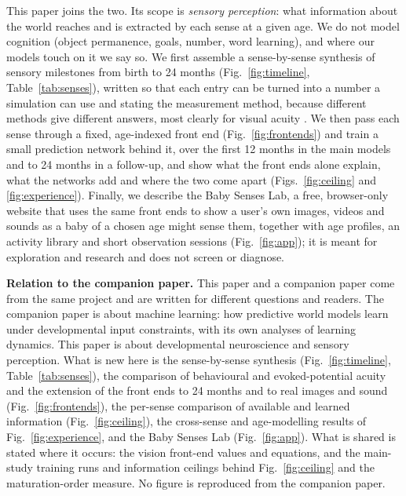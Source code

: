 \documentclass{article}
\begin{document}
This paper joins the two. Its scope is \emph{sensory perception}: what information about the world reaches and is extracted by each sense at a given age. We do not model cognition (object permanence, goals, number, word learning), and where our models touch on it we say so. We first assemble a sense-by-sense synthesis of sensory milestones from birth to 24 months (Fig.~\ref{fig:timeline}, Table~\ref{tab:senses}), written so that each entry can be turned into a number a simulation can use and stating the measurement method, because different methods give different answers, most clearly for visual acuity \autocite{dobson1978visual}. We then pass each sense through a fixed, age-indexed front end (Fig.~\ref{fig:frontends}) and train a small prediction network behind it, over the first 12 months in the main models and to 24 months in a follow-up, and show what the front ends alone explain, what the networks add and where the two come apart (Figs.~\ref{fig:ceiling} and \ref{fig:experience}). Finally, we describe the Baby Senses Lab, a free, browser-only website that uses the same front ends to show a user's own images, videos and sounds as a baby of a chosen age might sense them, together with age profiles, an activity library and short observation sessions (Fig.~\ref{fig:app}); it is meant for exploration and research and does not screen or diagnose.

\noindent\textbf{Relation to the companion paper.} This paper and a companion paper \autocite{mohapatra2026learn} come from the same project and are written for different questions and readers. The companion paper is about machine learning: how predictive world models learn under developmental input constraints, with its own analyses of learning dynamics. This paper is about developmental neuroscience and sensory perception. What is new here is the sense-by-sense synthesis (Fig.~\ref{fig:timeline}, Table~\ref{tab:senses}), the comparison of behavioural and evoked-potential acuity and the extension of the front ends to 24 months and to real images and sound (Fig.~\ref{fig:frontends}), the per-sense comparison of available and learned information (Fig.~\ref{fig:ceiling}), the cross-sense and age-modelling results of Fig.~\ref{fig:experience}, and the Baby Senses Lab (Fig.~\ref{fig:app}). What is shared is stated where it occurs: the vision front-end values and equations, and the main-study training runs and information ceilings behind Fig.~\ref{fig:ceiling} and the maturation-order measure. No figure is reproduced from the companion paper.
\end{document}
